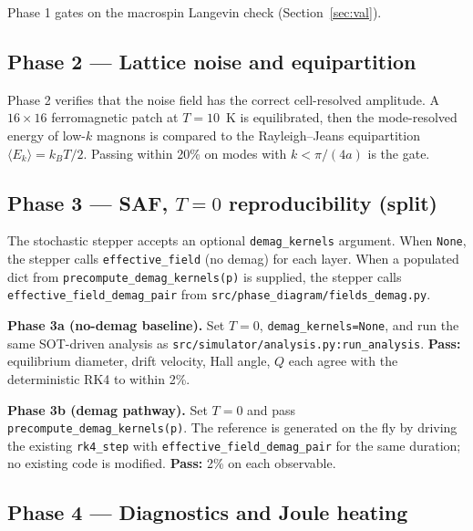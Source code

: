 \documentclass[11pt,a4paper]{article}
\newcommand{\kB}{k_B}
\begin{document}
Phase 1 gates on the macrospin Langevin check
(Section~\ref{sec:val}).

\subsection{Phase 2 --- Lattice noise and equipartition}

Phase 2 verifies that the noise field has the correct cell-resolved
amplitude. A $16 \times 16$ ferromagnetic patch at $T = 10$~K is
equilibrated, then the mode-resolved energy of low-$k$ magnons is
compared to the Rayleigh--Jeans equipartition $\langle E_k \rangle =
\kB T / 2$. Passing within 20\% on modes with $k < \pi/(4a)$ is the
gate.

\subsection{Phase 3 --- SAF, $T=0$ reproducibility (split)}

The stochastic stepper accepts an optional
\texttt{demag\_kernels} argument. When \texttt{None}, the stepper
calls \texttt{effective\_field} (no demag) for each layer. When a
populated dict from \texttt{precompute\_demag\_kernels(p)} is
supplied, the stepper calls \texttt{effective\_field\_demag\_pair}
from \texttt{src/phase\_diagram/fields\_demag.py}.

\textbf{Phase 3a (no-demag baseline).} Set $T=0$,
\texttt{demag\_kernels=None}, and run the same SOT-driven analysis
as \texttt{src/simulator/analysis.py:run\_analysis}. \textbf{Pass:}
equilibrium diameter, drift velocity, Hall angle, $Q$ each agree
with the deterministic RK4 to within 2\%.

\textbf{Phase 3b (demag pathway).} Set $T=0$ and pass
\texttt{precompute\_demag\_kernels(p)}. The reference is generated
on the fly by driving the existing \texttt{rk4\_step} with
\texttt{effective\_field\_demag\_pair} for the same duration; no
existing code is modified. \textbf{Pass:} 2\% on each observable.

\subsection{Phase 4 --- Diagnostics and Joule heating}
\end{document}
